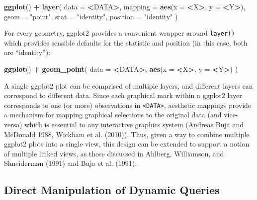 \documentclass[12pt,]{article}
\newenvironment{Shaded}{\begin{snugshade}}{\end{snugshade}}
\newcommand{\KeywordTok}[1]{\textcolor[rgb]{0.13,0.29,0.53}{\textbf{#1}}}
\newcommand{\DataTypeTok}[1]{\textcolor[rgb]{0.13,0.29,0.53}{#1}}
\newcommand{\StringTok}[1]{\textcolor[rgb]{0.31,0.60,0.02}{#1}}
\newcommand{\OperatorTok}[1]{\textcolor[rgb]{0.81,0.36,0.00}{\textbf{#1}}}
\newcommand{\NormalTok}[1]{#1}
\theoremstyle{definition}
\theoremstyle{definition}
\theoremstyle{remark}
\begin{document}
\begin{Shaded}
\begin{Highlighting}[]
\KeywordTok{ggplot}\NormalTok{() }\OperatorTok{+}\StringTok{ }\KeywordTok{layer}\NormalTok{(}
  \DataTypeTok{data =} \OperatorTok{<}\NormalTok{DATA}\OperatorTok{>}\NormalTok{, }
  \DataTypeTok{mapping =} \KeywordTok{aes}\NormalTok{(}\DataTypeTok{x =} \OperatorTok{<}\NormalTok{X}\OperatorTok{>}\NormalTok{, }\DataTypeTok{y =} \OperatorTok{<}\NormalTok{Y}\OperatorTok{>}\NormalTok{), }
  \DataTypeTok{geom =} \StringTok{"point"}\NormalTok{, }
  \DataTypeTok{stat =} \StringTok{"identity"}\NormalTok{,}
  \DataTypeTok{position =} \StringTok{"identity"}
\NormalTok{)}
\end{Highlighting}
\end{Shaded}

For every geometry, ggplot2 provides a convenient wrapper around
\texttt{layer()} which provides sensible defaults for the statistic and
position (in this case, both are ``identity''):

\begin{Shaded}
\begin{Highlighting}[]
\KeywordTok{ggplot}\NormalTok{() }\OperatorTok{+}\StringTok{ }\KeywordTok{geom_point}\NormalTok{(}
  \DataTypeTok{data =} \OperatorTok{<}\NormalTok{DATA}\OperatorTok{>}\NormalTok{, }
  \KeywordTok{aes}\NormalTok{(}\DataTypeTok{x =} \OperatorTok{<}\NormalTok{X}\OperatorTok{>}\NormalTok{, }\DataTypeTok{y =} \OperatorTok{<}\NormalTok{Y}\OperatorTok{>}\NormalTok{)}
\NormalTok{)}
\end{Highlighting}
\end{Shaded}

A single ggplot2 plot can be comprised of multiple layers, and different
layers can correspond to different data. Since each graphical mark
within a ggplot2 layer corresponds to one (or more) observations in
\texttt{\textless{}DATA\textgreater{}}, aesthetic mappings provide a
mechanism for mapping graphical selections to the original data (and
vice-versa) which is essential to any interactive graphics system
(Andreas Buja and McDonald 1988, Wickham et al. (2010)). Thus, given a
way to combine multiple ggplot2 plots into a single view, this design
can be extended to support a notion of multiple linked views, as those
discussed in Ahlberg, Williamson, and Shneiderman (1991) and Buja et al.
(1991).

\subsection{Direct Manipulation of Dynamic Queries}\label{extension}
\end{document}
